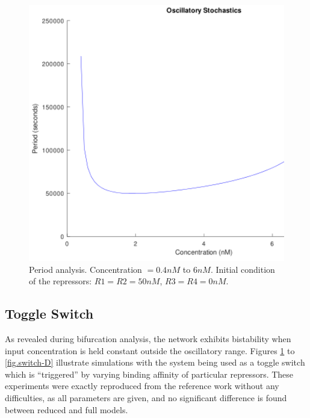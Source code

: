     \begin{figure}[!htbp]
      \centering
      \includegraphics[width=1\textwidth]{img/period6a.png}
      \caption{Period analysis. Concentration $= 0.4nM$ to $6nM$. Initial condition of the repressors: $R1 = R2 = 50nM$, $R3 = R4 = 0nM$.}
      \label{fig.switch-A}
    \end{figure}

  \subsection{Toggle Switch}

    As revealed during bifurcation analysis, the network exhibits bistability when input concentration is held constant outside the oscillatory range.
    Figures \ref{fig.switch-A} to \ref{fig.switch-D} illustrate simulations with the system being used as a toggle switch which is ``triggered'' by varying binding affinity of particular repressors.
    These experiments were exactly reproduced from the reference work without any difficulties, as all parameters are given, and no significant difference is found between reduced and full models.

